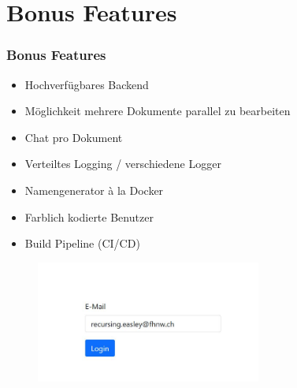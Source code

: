 \section{Bonus Features}
\begin{frame}
    \frametitle{Bonus Features}
    \begin{itemize}
        \item Hochverfügbares Backend
        \item Möglichkeit mehrere Dokumente parallel zu bearbeiten
        \item Chat pro Dokument
        \item Verteiltes Logging / verschiedene Logger
        \item Namengenerator à la Docker
        \item Farblich kodierte Benutzer
        \item Build Pipeline (CI/CD)
    \end{itemize}
    \begin{figure}
        \centering
        \includegraphics[height=4cm]{media/nameGenerator}
    \end{figure}
\end{frame}

